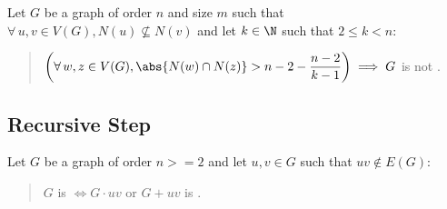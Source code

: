 \begin{corollary}
  \label{cor:inter}
  Let \(G\) be a graph of order \(n\) and size \(m\) such that \(\forall\,u,v\in V(G),N(u)\not\subseteq N(v)\) and let
  \(k\in\N\) such that \(2\le k<n\):
  \begin{quote}
    \(\displaystyle\left(\forall\,w,z\in V(G),\abs{N(w)\cap N(z)}>n-2-\frac{n-2}{k-1}\right)\implies G\) is not .
  \end{quote}
\end{corollary}

\subsection{Recursive Step}

\begin{lemma}
  \label{lem:recurse}
  Let \(G\) be a graph of order \(n>=2\) and let \(u,v\in G\) such that \(uv\notin E(G)\):
  \begin{quote}
    \(G\) is  \(\iff G\cdot uv\) or \(G+uv\) is .
  \end{quote}
\end{lemma}

